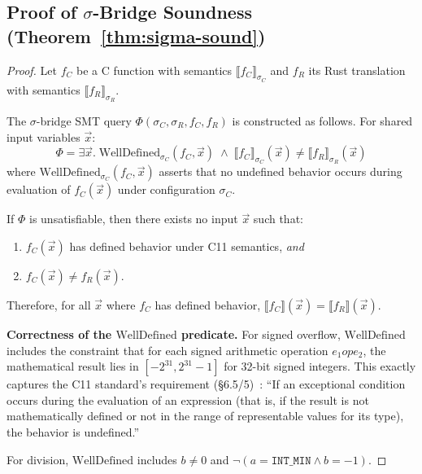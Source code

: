 \documentclass[11pt,a4paper]{article}
\begin{document}
\clearpage
\begin{appendices}

\section{Proof of $\sigma$-Bridge Soundness (Theorem~\ref{thm:sigma-sound})}\label{app:proof-sigma-sound}

\begin{proof}
Let $f_C$ be a C function with semantics $\llbracket f_C \rrbracket_{\sigma_C}$
and $f_R$ its Rust translation with semantics $\llbracket f_R \rrbracket_{\sigma_R}$.

The $\sigma$-bridge SMT query $\Phi(\sigma_C, \sigma_R, f_C, f_R)$ is
constructed as follows.  For shared input variables $\vec{x}$:
\[
\Phi = \exists \vec{x}.\; \text{WellDefined}_{\sigma_C}(f_C, \vec{x})
    \;\wedge\; \llbracket f_C \rrbracket_{\sigma_C}(\vec{x})
    \neq \llbracket f_R \rrbracket_{\sigma_R}(\vec{x})
\]
where $\text{WellDefined}_{\sigma_C}(f_C, \vec{x})$ asserts that no
undefined behavior occurs during evaluation of $f_C(\vec{x})$ under
configuration $\sigma_C$.

If $\Phi$ is unsatisfiable, then there exists no input $\vec{x}$ such that:
\begin{enumerate}
  \item $f_C(\vec{x})$ has defined behavior under C11 semantics, \emph{and}
  \item $f_C(\vec{x}) \neq f_R(\vec{x})$.
\end{enumerate}

Therefore, for all $\vec{x}$ where $f_C$ has defined behavior,
$\llbracket f_C \rrbracket(\vec{x}) = \llbracket f_R \rrbracket(\vec{x})$.

\textbf{Correctness of the $\text{WellDefined}$ predicate.}
For signed overflow, $\text{WellDefined}$ includes the constraint that for
each signed arithmetic operation $e_1 \mathbin{op} e_2$, the mathematical
result lies in $[-2^{31}, 2^{31}-1]$ for 32-bit signed integers.  This
exactly captures the C11 standard's requirement
(\S6.5/5)~\cite{iso9899}: ``If an exceptional condition occurs
during the evaluation of an expression (that is, if the result is not
mathematically defined or not in the range of representable values for
its type), the behavior is undefined.''

For division, $\text{WellDefined}$ includes $b \neq 0$ and
$\neg(a = \texttt{INT\_MIN} \wedge b = -1)$.


\end{proof}
\end{appendices}
\end{document}

